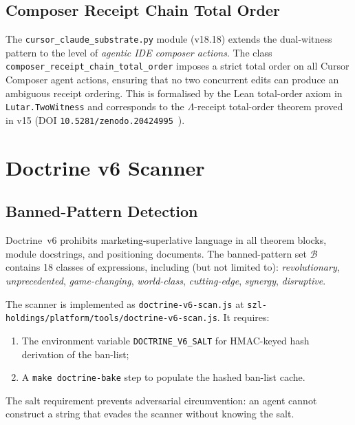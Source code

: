 \subsection{Composer Receipt Chain Total Order}
\label{ssec:composer-receipt}

The \texttt{cursor\_claude\_substrate.py} module (v18.18) extends the
dual-witness pattern to the level of \emph{agentic IDE composer actions}.
The class \texttt{composer\_receipt\_chain\_total\_order} imposes a strict
total order on all Cursor Composer agent actions, ensuring that no two
concurrent edits can produce an ambiguous receipt ordering.  This is
formalised by the Lean total-order axiom in \texttt{Lutar.TwoWitness}
and corresponds to the \(\Lambda\)-receipt total-order theorem proved in
v15 (DOI \texttt{10.5281/zenodo.20424995}~\cite{lutar_v15_doi}).

\section{Doctrine v6 Scanner}
\label{sec:doctrine-scanner}

\subsection{Banned-Pattern Detection}
\label{ssec:banned-patterns}

Doctrine~v6 prohibits marketing-superlative language in all theorem blocks,
module docstrings, and positioning documents.  The banned-pattern set
\(\mathcal{B}\) contains 18 classes of expressions, including (but not
limited to): \emph{revolutionary}, \emph{unprecedented}, \emph{game-changing},
\emph{world-class}, \emph{cutting-edge}, \emph{synergy}, \emph{disruptive}.

The scanner is implemented as \texttt{doctrine-v6-scan.js} at
\texttt{szl-holdings/platform/tools/doctrine-v6-scan.js}.  It requires:

\begin{enumerate}
  \item The environment variable \texttt{DOCTRINE\_V6\_SALT} for HMAC-keyed
    hash derivation of the ban-list;
  \item A \texttt{make doctrine-bake} step to populate the hashed ban-list
    cache.
\end{enumerate}

The salt requirement prevents adversarial circumvention: an agent cannot
construct a string that evades the scanner without knowing the salt.

